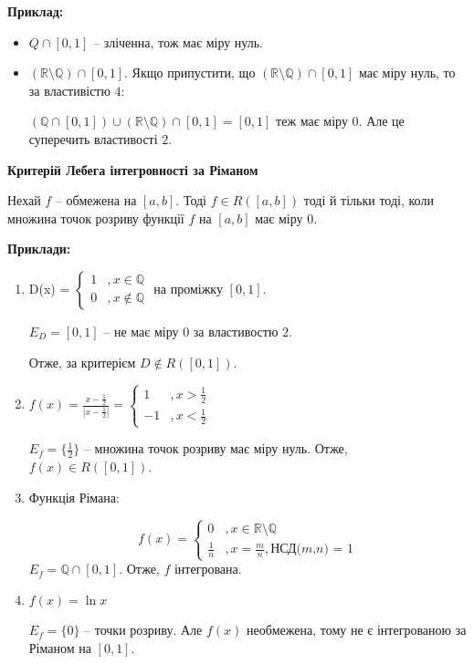 \documentclass[12pt]{report}
\begin{document}
	\textbf{Приклад:}
	
	\begin{itemize}
		
		\item $Q \cap [0,1]$ -- зліченна, тож має міру нуль.
		\item $(\mathbb{R} \setminus \mathbb{Q}) \cap [0,1]$. Якщо припустити, що $(\mathbb{R} \setminus \mathbb{Q}) \cap [0,1]$ 
		має міру нуль, то за властивістю $4$:
		
		$(\mathbb{Q}\cap[0,1]) \cup (\mathbb{R} \setminus \mathbb{Q}) \cap [0,1] = [0,1]$ теж має міру 0. Але це суперечить властивості $2$.
		
	\end{itemize}
	
	
	\textbf{Критерій Лебега інтегровності за Ріманом}
	
	Нехай $f$ -- обмежена на $[a,b]$. Тоді $f \in R([a,b])$ тоді й тільки тоді, коли множина точок розриву функції $f$ на $[a,b]$ має міру $0$.
	
	
	\textbf{Приклади:}
	
	\begin{enumerate}
		\item D(x) = $\begin{cases} 1 &, x \in \mathbb{Q} \\ 0 &, x \notin \mathbb{Q} \end{cases}$ на проміжку $[0,1]$.
		
		$E_{D} = [0,1]$ -- не має міру $0$ за властивостю $2$.
		
		Отже, за критерієм $D \notin R([0,1])$.
		
		\item $f(x) = \frac{x - \frac{1}{2}}{|x - \frac{1}{2}|} = \begin{cases} 1 &, x > \frac{1}{2} \\ -1 &, x < \frac{1}{2} \end{cases}$
		
		$E_f = \{\frac{1}{2}\}$ -- множина точок розриву має міру нуль. Отже, $f(x) \in R([0,1])$.
		
		\item Функція Рімана:
		
		$$f(x) = \begin{cases} 0 &, x \in \mathbb{R} \setminus \mathbb{Q} \\ 
		\frac{1}{n} &, x = \frac{m}{n}, \textrm{НСД($m$,$n$) = 1}
		\end{cases}$$
		$E_f = \mathbb{Q} \cap [0,1]$. Отже, $f$ інтегрована.
		
		\item $f(x) = \ln x$
		
		$E_f = \{0\}$ -- точки розриву. Але $f(x)$ необмежена, тому не є інтегрованою за Ріманом на $[0,1]$.
		
	\end{enumerate}
\end{document}
